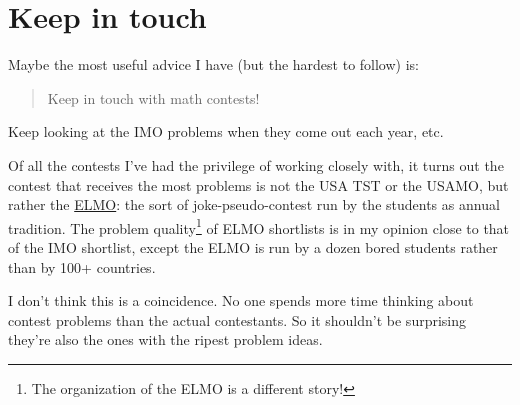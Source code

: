 \documentclass[11pt]{scrartcl}
\theoremstyle{inlined}
\begin{document}
%
%
%
%

\section{Keep in touch}
Maybe the most useful advice I have (but the hardest to follow) is:
\begin{quote}
   Keep in touch with math contests!
\end{quote}
Keep looking at the IMO problems when they come out each year, etc.

Of all the contests I've had the privilege of working closely with,
it turns out the contest that receives the most problems
is not the USA TST or the USAMO, but rather the
\href{http://elmo.evanchen.cc/}{ELMO}:
the sort of joke-pseudo-contest run by the students as annual tradition.
The problem quality\footnote{The organization of the ELMO is a different story!}
of ELMO shortlists is in my opinion
close to that of the IMO shortlist, except the ELMO is run by
a dozen bored students rather than by 100+ countries.

I don't think this is a coincidence.
No one spends more time thinking about contest problems
than the actual contestants.
So it shouldn't be surprising they're also the ones with the
ripest problem ideas.

\end{document}
